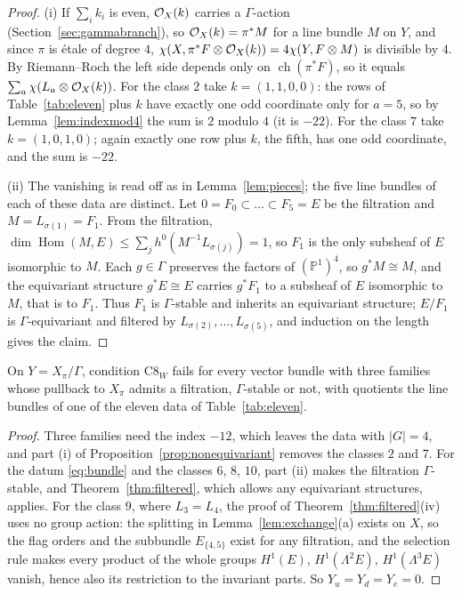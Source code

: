 \begin{proof}
(i) If $\sum_ik_i$ is even, $\mathcal{O}_X(k)$ carries a $\Gamma$-action
(Section~\ref{sec:gammabranch}), so $\mathcal{O}_X(k)=\pi^*M$ for a line bundle
$M$ on $Y$, and since $\pi$ is \'etale of degree $4$,
$\chi(X,\pi^*F\otimes\mathcal{O}_X(k))=4\chi(Y,F\otimes M)$ is divisible by $4$.
By Riemann--Roch the left side depends only on
$\operatorname{ch}(\pi^*F)$, so it equals
$\sum_a\chi(L_a\otimes\mathcal{O}_X(k))$. For the class $2$ take
$k=(1,1,0,0)$: the rows of Table~\ref{tab:eleven} plus $k$ have exactly
one odd coordinate only for $a=5$, so by Lemma~\ref{lem:indexmod4} the
sum is $2$ modulo $4$ (it is $-22$). For the class $7$ take
$k=(1,0,1,0)$; again exactly one row plus $k$, the fifth, has one odd
coordinate, and the sum is $-22$.

(ii) The vanishing is read off as in Lemma~\ref{lem:pieces}; the five
line bundles of each of these data are distinct. Let
$0=F_0\subset\dots\subset F_5=E$ be the filtration and
$M=L_{\sigma(1)}=F_1$. From the filtration,
$\dim\operatorname{Hom}(M,E)\le\sum_jh^0(M^{-1}L_{\sigma(j)})=1$, so
$F_1$ is the only subsheaf of $E$ isomorphic to $M$. Each $g\in\Gamma$
preserves the factors of $(\mathbb P^1)^4$, so $g^*M\cong M$, and the
equivariant structure $g^*E\cong E$ carries $g^*F_1$ to a subsheaf of $E$
isomorphic to $M$, that is to $F_1$. Thus $F_1$ is $\Gamma$-stable and
inherits an equivariant structure; $E/F_1$ is $\Gamma$-equivariant and
filtered by $L_{\sigma(2)},\dots,L_{\sigma(5)}$, and induction on the
length gives the claim.
\end{proof}

\begin{corollary}\label{cor:nonequivariant}
On $Y=X_\pi/\Gamma$, condition $\mathrm C8_W$ fails for every vector
bundle with three families whose pullback to $X_\pi$ admits a filtration,
$\Gamma$-stable or not, with quotients the line bundles of one of the
eleven data of Table~\ref{tab:eleven}.
\end{corollary}
\begin{proof}
Three families need the index $-12$, which leaves the data with $|G|=4$,
and part (i) of Proposition~\ref{prop:nonequivariant} removes the classes
$2$ and $7$. For the datum \eqref{eq:bundle} and the classes $6$, $8$, $10$,
part (ii) makes the filtration $\Gamma$-stable, and
Theorem~\ref{thm:filtered}, which allows any equivariant structures,
applies. For the class $9$, where $L_3=L_4$, the proof of
Theorem~\ref{thm:filtered}(iv) uses no group action: the splitting in
Lemma~\ref{lem:exchange}(a) exists on $X$, so the flag orders and the
subbundle $E_{\{4,5\}}$ exist for any filtration, and the selection rule
makes every product of the whole groups $H^1(E)$, $H^1(\Lambda^2E)$,
$H^1(\Lambda^3E)$ vanish, hence also its restriction to the invariant
parts. So $Y_u=Y_d=Y_e=0$.
\end{proof}

